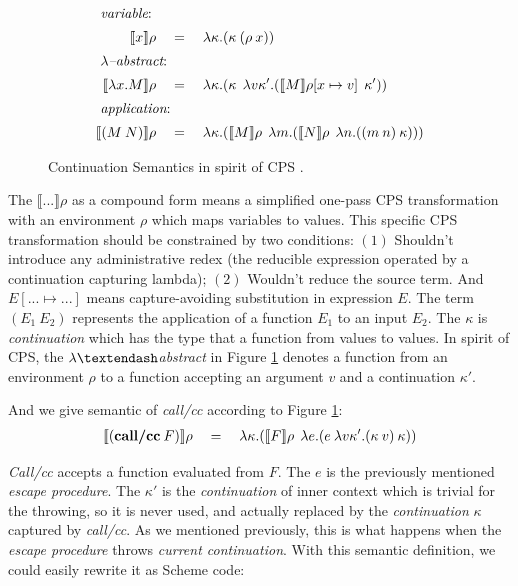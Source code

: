 \documentclass[numbers,numberedpars]{sigplanconf}
\begin{document}
\begin{figure}[tbph]
  \raggedright
  \begin{align*}
    \shortintertext{ {\it variable}: }
    \llbracket{x}\rrbracket\rho \quad&=\quad \lambda{\kappa}.(\kappa \: (\rho \: x))
    \\
    \shortintertext{ {\it $\lambda$\textendash abstract}: }
    \llbracket{\lambda{x}.M}\rrbracket\rho \quad&=\quad
    \lambda{\kappa}.(\kappa\:\:\lambda{v\kappa'}.(\llbracket{M}\rrbracket\rho[x \mapsto v]\:\:\kappa'))
    \\
    \shortintertext{ {\it application}: }
    \llbracket{(M\:N)}\rrbracket\rho \quad&=\quad
    \lambda{\kappa}.(\llbracket{M}\rrbracket\rho\:\:\lambda{m}.(\llbracket{N}\rrbracket\rho\:\:\lambda{n}.((m\:n)\:\kappa)))
  \end{align*}
  \caption{Continuation Semantics in spirit of CPS
    \citep{Danvy92representingcontrol:}\citep{Gasbichler:2002:FSC:581478.581504}.}
    \label{fig:cont_sema}
\end{figure}

The $\llbracket{...}\rrbracket\rho$ as a compound form means a simplified one-pass CPS transformation with an environment $\rho$
which maps variables to values. This specific CPS transformation should be constrained by two conditions:
$(1)$ Shouldn't introduce any administrative redex (the reducible expression operated by a continuation capturing lambda);
$(2)$ Wouldn't reduce the source term. And $E[...\mapsto...]$ means capture-avoiding substitution in expression $E$.
The term $(E_1\:E_2)$ represents the application of a function $E_1$ to an input $E_2$. The $\kappa$
is {\it continuation} which has the type that a function from values to values. In spirit of CPS,
the $\lambda\textendash${\it abstract} in Figure \ref{fig:cont_sema} denotes a function from an environment $\rho$ to a function
accepting an argument $v$ and a continuation $\kappa'$.

And we give semantic of {\it call/cc} according to Figure \ref{fig:cont_sema}:
\begin{align*}
  \llbracket{(\text{{\bf call/cc}}\:F)}\rrbracket\rho \quad=\quad
  \lambda{\kappa}.(\llbracket{F}\rrbracket\rho\:\: \lambda{e}.(e\: \lambda{v\kappa'}.(\kappa\:v)\: \kappa))
\end{align*}

{\it Call/cc} accepts a function evaluated from $F$. The $e$ is the previously mentioned {\it escape procedure}.
The $\kappa'$ is the {\it continuation} of inner context which is trivial for the throwing, so it is never used, and actually replaced
by the {\it continuation} $\kappa$ captured by {\it call/cc}. As we mentioned previously, this is what happens when the {\it escape procedure}
throws {\it current continuation}. With this semantic definition, we could easily rewrite it as Scheme code:
\end{document}
